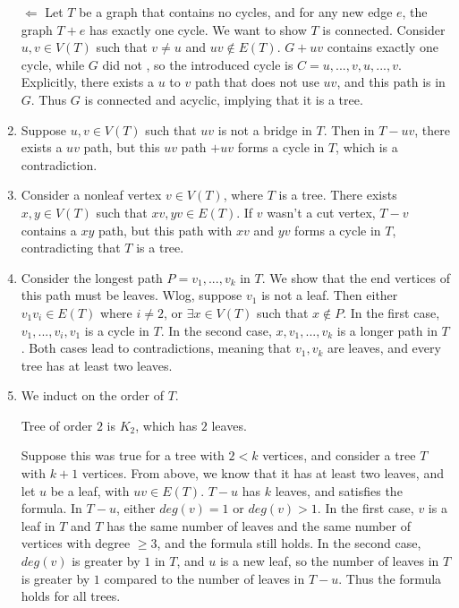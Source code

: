 \documentclass[11pt]{article}
\begin{document}
\begin{enumerate}[1]
        $\Leftarrow$ Let $T$ be a graph that contains no cycles, and for 
        any new edge $e$, the graph $T + e$ has exactly one cycle. We want to
        show $T$ is connected. Consider $u, v \in V(T)$ such that $v \neq u$ and 
        $uv \notin E(T)$. $G + uv$ contains exactly one cycle, while $G$ did not
        , so the introduced cycle is $C = u, ..., v, u, ..., v$. Explicitly, 
        there exists a $u$ to $v$ path that does not use $uv$, and this path is 
        in $G$. Thus $G$ is connected and acyclic, implying that it is a tree. 
        
    \item %
        Suppose $u, v \in V(T)$ such that $uv$ is not a bridge in $T$. Then in 
        $T - uv$, there exists a $uv$ path, but this $uv$ path $+ uv$ forms a 
        cycle in $T$, which is a contradiction. 
    \item %
        Consider a nonleaf vertex $v \in V(T)$, where $T$ is a tree. There exists
        $x, y \in V(T)$ such that $xv, yv \in E(T)$. If $v$ wasn't a cut vertex,
        $T - v$ contains a $xy$ path, but this path with $xv$ and $yv$ forms a
        cycle in $T$, contradicting that $T$ is a tree.

    \item %
        Consider the longest path $P = v_1, ..., v_k$ in $T$. We show that 
        the end vertices of this path must be leaves. Wlog, suppose $v_1$ 
        is not a leaf. Then either $v_1v_i \in E(T)$ where $i \neq 2$, or 
        $\exists x \in V(T)$ such that $x \notin P$. In the first case,
        $v_1, ..., v_i, v_1$ is a cycle in $T$. In the second case, 
        $x, v_1, ..., v_k$ is a longer path in $T$. Both cases lead to 
        contradictions, meaning that $v_1, v_k$ are leaves, and every tree
        has at least two leaves. 
        
    \item %
        We induct on the order of $T$.

        Tree of order $2$ is $K_2$, which has $2$ leaves. 

        Suppose this was true for a tree with $2 < k$ vertices, and consider 
        a tree $T$ with $k + 1$ vertices. From above, we know that it has at 
        least two leaves, and let $u$ be a leaf, with $uv \in E(T)$. 
        $T - u$ has $k$ leaves, and satisfies the formula. In $T - u$, either
        $deg(v) = 1$ or $deg(v) > 1$. In the first case, $v$ is a leaf in $T$
        and $T$ has the same number of leaves and the same number of vertices
        with degree $\geq 3$, and the formula still holds. In the second case,
        $deg(v)$ is greater by $1$ in $T$, and $u$ is a new leaf, so the number 
        of leaves in $T$ is greater by $1$ compared to the number of leaves in 
        $T - u$. Thus the formula holds for all trees. 


\end{enumerate}
\end{document}
